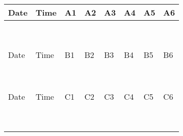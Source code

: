 \documentclass{report}
\begin{document}
\begin{tabular}
{|m{1.3cm}|m{0.8cm}|m{1.8cm}|m{1.8cm}|m{1.8cm}|m{1.8cm}|m{1.8cm}|m{1.8cm}|} \\ 
\toprule
Date  & Time & A1 & A2 & A3 & A4 & A5 & A6 \\ \hline 

    &   &   &  &  &  &  & \\ \hline 
    &   &   &  &  &  &  & \\ \hline 
    &   &   &  &  &  &  & \\ \hline 
    &   &   &  &  &  &  & \\ \hline 
    &   &   &  &  &  &  & \\ \hline 
    &   &   &  &  &  &  & \\ \hline 
    &   &   &  &  &  &  & \\ \hline 
    &   &   &  &  &  &  & \\ \hline 
    &   &   &  &  &  &  & \\ \midrule 

Date & Time & B1  & B2 & B3 & B4 & B5 & B6 \\ \hline 
    &   &   &  &  &  &  & \\ \hline 
    &   &   &  &  &  &  & \\ \hline 
    &   &   &  &  &  &  & \\ \hline 
    &   &   &  &  &  &  & \\ \hline 
    &   &   &  &  &  &  & \\ \hline 
    &   &   &  &  &  &  & \\ \hline 
    &   &   &  &  &  &  & \\ \hline 
    &   &   &  &  &  &  & \\ \hline 
    &   &   &  &  &  &  & \\ \midrule 

Date & Time & C1 & C2 & C3 & C4 & C5 & C6 \\  \hline 
    &   &   &  &  &  &  & \\ \hline 
    &   &   &  &  &  &  & \\ \hline 
    &   &   &  &  &  &  & \\ \hline 
    &   &   &  &  &  &  & \\ \hline 
    &   &   &  &  &  &  & \\ \hline 
    &   &   &  &  &  &  & \\ \hline 
    &   &   &  &  &  &  & \\ \hline 
    &   &   &  &  &  &  & \\ \hline 
    &   &   &  &  &  &  & \\ \midrule 


\end{tabular}
\end{document}
